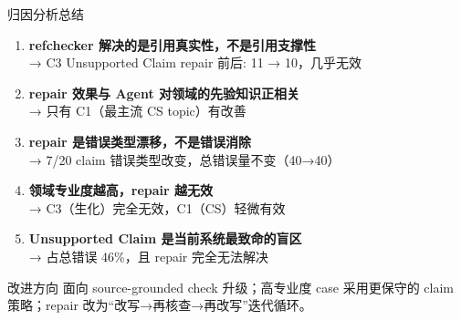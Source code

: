 \documentclass[UTF8,fontset=fandol,aspectratio=169]{ctexbeamer}
\begin{document}
\begin{frame}{归因分析总结}
  \begin{enumerate}
    \item \textbf{refchecker 解决的是引用真实性，不是引用支撑性}\\
    \quad → C3 Unsupported Claim repair 前后: 11 → 10，几乎无效

    \item \textbf{repair 效果与 Agent 对领域的先验知识正相关}\\
    \quad → 只有 C1（最主流 CS topic）有改善

    \item \textbf{repair 是错误类型漂移，不是错误消除}\\
    \quad → 7/20 claim 错误类型改变，总错误量不变（40→40）

    \item \textbf{领域专业度越高，repair 越无效}\\
    \quad → C3（生化）完全无效，C1（CS）轻微有效

    \item \textbf{Unsupported Claim 是当前系统最致命的盲区}\\
    \quad → 占总错误 46\%，且 repair 完全无法解决
  \end{enumerate}

  \vspace{0.4em}
  \begin{block}{改进方向}
    面向 source-grounded check 升级；高专业度 case 采用更保守的 claim 策略；repair 改为“改写→再核查→再改写”迭代循环。
  \end{block}
\end{frame}

\end{document}
